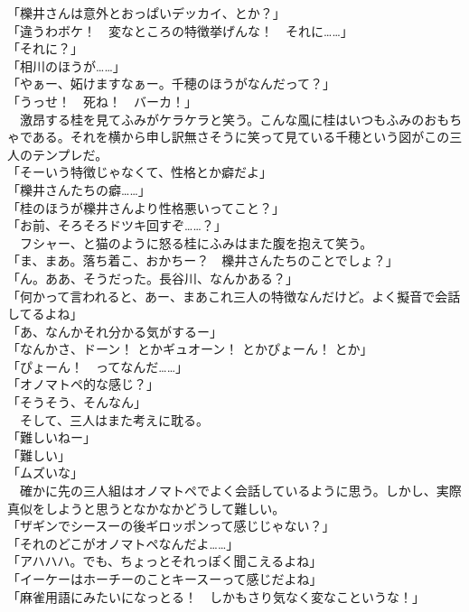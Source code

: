 「櫟井さんは意外とおっぱいデッカイ、とか？」\\
「違うわボケ！　変なところの特徴挙げんな！　それに……」\\
「それに？」\\
「相川のほうが……」\\
「やぁー、妬けますなぁー。千穂のほうがなんだって？」\\
「うっせ！　死ね！　バーカ！」\\
　激昂する桂を見てふみがケラケラと笑う。こんな風に桂はいつもふみのおもちゃである。それを横から申し訳無さそうに笑って見ている千穂という図がこの三人のテンプレだ。\\
「そーいう特徴じゃなくて、性格とか癖だよ」\\
「櫟井さんたちの癖……」\\
「桂のほうが櫟井さんより性格悪いってこと？」\\
「お前、そろそろドツキ回すぞ……？」\\
　フシャー、と猫のように怒る桂にふみはまた腹を抱えて笑う。\\
「ま、まあ。落ち着こ、おかちー？　櫟井さんたちのことでしょ？」\\
「ん。ああ、そうだった。長谷川、なんかある？」\\
「何かって言われると、あー、まあこれ三人の特徴なんだけど。よく擬音で会話してるよね」\\
「あ、なんかそれ分かる気がするー」\\
「なんかさ、ドーン！ とかギュオーン！ とかぴょーん！ とか」\\
「ぴょーん！　ってなんだ……」\\
「オノマトペ的な感じ？」\\
「そうそう、そんなん」\\
　そして、三人はまた考えに耽る。\\
「難しいねー」\\
「難しい」\\
「ムズいな」\\
　確かに先の三人組はオノマトペでよく会話しているように思う。しかし、実際真似をしようと思うとなかなかどうして難しい。\\
「ザギンでシースーの後ギロッポンって感じじゃない？」\\
「それのどこがオノマトペなんだよ……」\\
「アハハハ。でも、ちょっとそれっぽく聞こえるよね」\\
「イーケーはホーチーのことキースーって感じだよね」\\
「麻雀用語にみたいになっとる！　しかもさり気なく変なこというな！」\\
